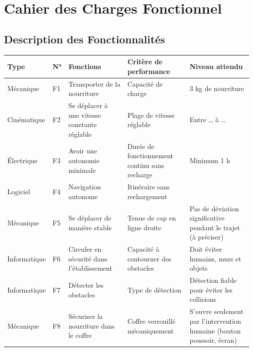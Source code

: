 \documentclass[a4paper,12pt]{report}  %
\begin{document}
\section{Cahier des Charges Fonctionnel}

\subsection{Description des Fonctionnalités}

{\fontsize{10pt}{12pt}\selectfont 
	\begin{longtable}{|l|l|p{4cm}|p{4cm}|p{4cm}|}
		\hline
		\textbf{Type} & \textbf{N°} & \textbf{Fonctions} 
		& \textbf{Critère de performance} & \textbf{Niveau attendu} \\
		\hline
		\endhead
		
		\hline
		\endfoot
		
		\hline
		Mécanique & F1 & Transporter de la nourriture & Capacité de charge & 3 kg de nourriture  \\
		
		\hline
		Cinématique & F2 & Se déplacer à une vitesse constante réglable & Plage de vitesse réglable & Entre \ldots{} à \ldots{}  \\
		
		\hline
		Électrique & F3 & Avoir une autonomie minimale & Durée de fonctionnement continu sans recharge & Minimum 1 h  \\
		
		\hline
		Logiciel & F4 & Navigation autonome & Itinéraire sans rechargement & \\
		
		\hline
		Mécanique & F5 & Se déplacer de manière stable & Tenue de cap en ligne droite & Pas de déviation significative pendant le trajet (à préciser) \\
		
		\hline
		Informatique & F6 & Circuler en sécurité dans l'établissement & Capacité à contourner des obstacles & Doit éviter humains, murs et objets  \\
		
		\hline
		Informatique & F7 & Détecter les obstacles & Type de détection & Détection fiable pour éviter les collisions \\
		
		\hline
		Mécanique & F8 & Sécuriser la nourriture dans le coffre & Coffre verrouillé mécaniquement & S'ouvre seulement par l'intervention humaine (bouton poussoir, écran)  \\
		

\end{longtable}}
\end{document}
